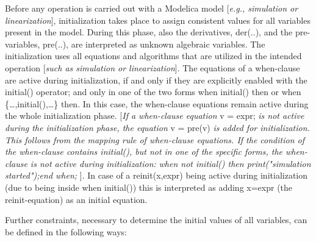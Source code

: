 Before any operation is carried out with a Modelica model {[}\emph{e.g.,
simulation or linearization}{]}, initialization takes place to assign
consistent values for all variables present in the model. During this
phase, also the derivatives, der(..), and the pre-variables, pre(..),
are interpreted as unknown algebraic variables. The initialization uses
all equations and algorithms that are utilized in the intended operation
{[}\emph{such as simulation or linearization}{]}. The equations of a
when-clause are active during initialization, if and only if they are
explicitly enabled with the initial() operator; and only in one of the
two forms when initial() then or when \{\ldots{},initial(),\ldots{}\}
then. In this case, the when-clause equations remain active during the
whole initialization phase. {[}\emph{If a when-clause equation} v =
expr; \emph{is not active during the initialization phase, the equation}
v = pre(v) \emph{is added for initialization. This follows from the
mapping rule of when-clause equations. If the condition of the
when-clause contains initial(), but not in one of the specific forms,
the when-clause is not active during initialization:} \emph{when not
initial() then print("simulation started");end when;} {]}. In case of a
reinit(x,expr) being active during initialization (due to being inside
when initial()) this is interpreted as adding x=expr (the
reinit-equation) as an initial equation.

Further constraints, necessary to determine the initial values of all
variables, can be defined in the following ways:

